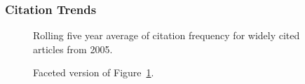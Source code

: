 \documentclass[
  10pt,
  letterpaper,
  DIV=11,
  numbers=noendperiod,
  twoside]{scrartcl}
\begin{document}
\subsubsection*{Citation Trends}\label{sec-trends-2005}

\begin{figure}


\caption{\label{fig-citation-spaghetti-2005}Rolling five year average of
citation frequency for widely cited articles from 2005.}

\end{figure}%

\begin{figure}


\caption{\label{fig-citation-facet-2005}Faceted version of
Figure~\ref{fig-citation-spaghetti-2005}.}

\end{figure}%
\end{document}
